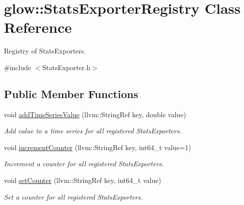 \hypertarget{classglow_1_1_stats_exporter_registry}{}\section{glow\+:\+:Stats\+Exporter\+Registry Class Reference}
\label{classglow_1_1_stats_exporter_registry}


Registry of Stats\+Exporters.  




{\ttfamily \#include $<$Stats\+Exporter.\+h$>$}

\subsection*{Public Member Functions}
\begin{DoxyCompactItemize}
\item 
\mbox{\label{classglow_1_1_stats_exporter_registry_a8fdc5156e41840228e58f2301ec85779}} 
void \hyperlink{classglow_1_1_stats_exporter_registry_a8fdc5156e41840228e58f2301ec85779}{add\+Time\+Series\+Value} (llvm\+::\+String\+Ref key, double value)
\begin{DoxyCompactList}\small\item\em Add value to a time series for all registered Stats\+Exporters. \end{DoxyCompactList}\item 
\mbox{\label{classglow_1_1_stats_exporter_registry_a866e879d431fbb51e14d36608d8887a4}} 
void \hyperlink{classglow_1_1_stats_exporter_registry_a866e879d431fbb51e14d36608d8887a4}{increment\+Counter} (llvm\+::\+String\+Ref key, int64\+\_\+t value=1)
\begin{DoxyCompactList}\small\item\em Increment a counter for all registered Stats\+Exporters. \end{DoxyCompactList}\item 
\mbox{\label{classglow_1_1_stats_exporter_registry_a5e04d5795478d303a41f88c67a908f76}} 
void \hyperlink{classglow_1_1_stats_exporter_registry_a5e04d5795478d303a41f88c67a908f76}{set\+Counter} (llvm\+::\+String\+Ref key, int64\+\_\+t value)
\begin{DoxyCompactList}\small\item\em Set a counter for all registered Stats\+Exporters. \end{DoxyCompactList}\item 

\end{DoxyCompactItemize}
